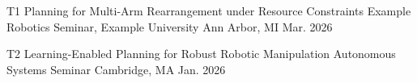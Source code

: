 

\VectraTalkEntry
    {T1}
    {Planning for Multi-Arm Rearrangement under Resource Constraints}
    {Example Robotics Seminar, Example University}
    {Ann Arbor, MI}
    {
    }
    {Mar. 2026}

\VectraTalkEntry
    {T2}
    {Learning-Enabled Planning for Robust Robotic Manipulation}
    {Autonomous Systems Seminar}
    {Cambridge, MA}
    {
    }
    {Jan. 2026}